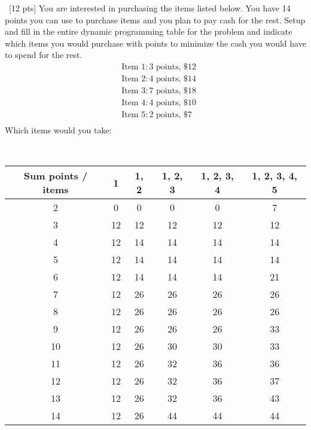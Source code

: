 \documentclass[12pt]{article}
\newenvironment{sol}[1][Solution]{\begin{trivlist}\item[\hskip\labelsep {\bfseries #1:}]}{\end{trivlist}}
\begin{document}
\begin{enumerate}
    \item \ [12 pts] You are interested in purchasing the items listed below. You have 14 points you can use to purchase items and you plan to pay cash for the rest. Setup and fill in the entire dynamic programming table for the problem and indicate which items you would purchase with points to minimize the cash you would have to spend for the rest.
    \begin{align*}
        &\text{Item } 1: 3 \text{ points, \$} 12 \\
        &\text{Item } 2: 4 \text{ points, \$} 14 \\
        &\text{Item } 3: 7 \text{ points, \$} 18 \\
        &\text{Item } 4: 4 \text{ points, \$} 10 \\
        &\text{Item } 5: 2 \text{ points, \$} 7 \\
    \end{align*}
    Which items would you take:
    \begin{sol}
    \hspace*{\fill}\\
    \begin{center}

    \begin{tabular}{|c|c|c|c|c|c|}
    \hline
         Sum points / items & 1  &1, 2  &1, 2, 3 &1, 2, 3, 4 & 1, 2, 3, 4, 5 \\
         \hline
            2      & 0& 0& 0& 0& 7  \\
         \hline
            3      & 12& 12& 12& 12 & 12  \\
         \hline
            4     & 12& 14& 14& 14 &  14\\
         \hline
            5      & 12& 14& 14&  14& 14 \\
         \hline
            6      & 12& 14& 14&  14& 21 \\
         \hline
            7      & 12& 26& 26&26  &  26\\
         \hline
            8      & 12& 26& 26&  26&  26\\
         \hline
            9      & 12& 26& 26& 26 &  33\\
         \hline
            10      & 12& 26& 30& 30&  33\\
         \hline
            11      & 12& 26&32 & 36&  36\\
         \hline
            12      & 12& 26&32 & 36&  37\\
         \hline
            13      & 12& 26&32 & 36&  43\\
         \hline
            14      & 12& 26& 44& 44&  44\\
         \hline
    \end{tabular}
        

\end{center}
\end{sol}
\end{enumerate}
\end{document}
